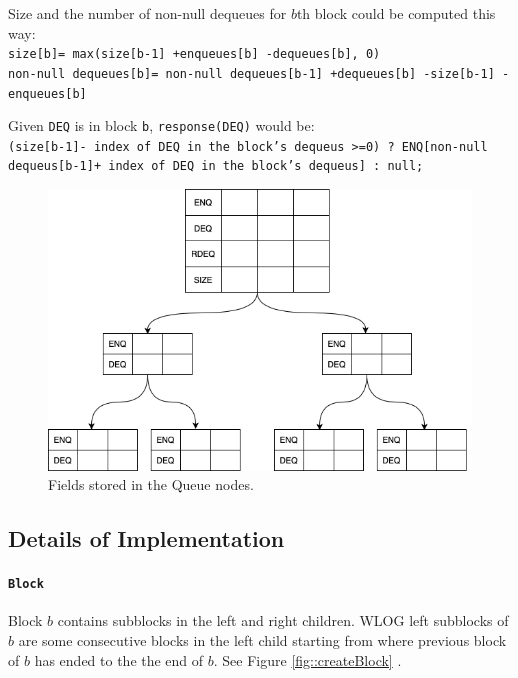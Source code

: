 \documentclass[10pt]{article}
\renewcommand{\tt}[1]{\texttt{#1}}
\theoremstyle{definition}
\begin{document}
Size and the number of non-null dequeues for $b$th block could be computed this way:\\
\texttt{size[b]= max(size[b-1] +enqueues[b] -dequeues[b], 0)}\\
\texttt{non-null dequeues[b]= non-null dequeues[b-1] +dequeues[b] -size[b-1] -enqueues[b]}

Given \texttt{DEQ} is in block \texttt{b}, \texttt{response(DEQ)} would be:\\
\texttt{(size[b-1]- index of DEQ in the block's dequeus >=0) ? ENQ[non-null dequeus[b-1]+ index of DEQ in the block's dequeus] : null;}


\begin{figure}[hbt]
\centering
  \includegraphics[width=5in]{pics/queue}
  \caption{Fields stored in the Queue nodes. \label{fig::queue}}
\end{figure}


\subsection{Details of Implementation}

\paragraph{\tt{Block}}
Block $b$ contains subblocks in the left and right children. WLOG left subblocks of $b$ are some consecutive blocks in the left child starting from where previous block of $b$ has ended to the the end of $b$. See Figure \ref{fig::createBlock} .
\end{document}
